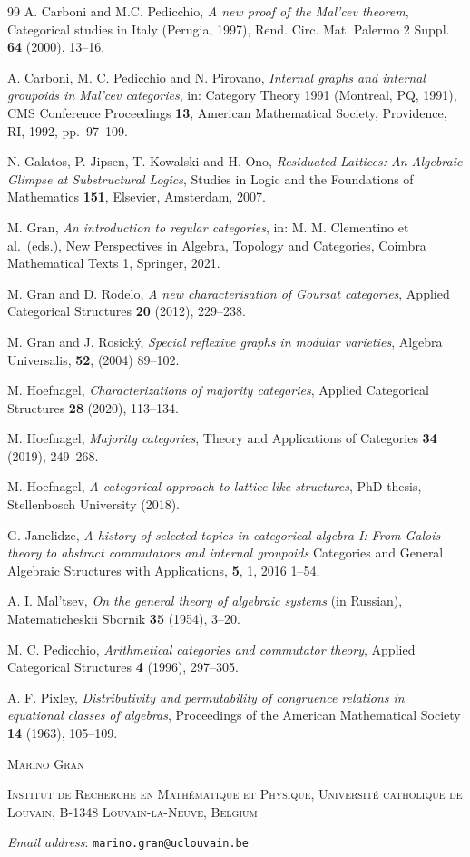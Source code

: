 \documentclass[11pt,a4paper]{article}
\theoremstyle{plain}
\theoremstyle{definition}
\theoremstyle{remark}
\theoremstyle{plain}
\newcommand{\finaladdress}[3]{%
  \bigskip\noindent
  {\scshape #1}\par
  \smallskip\noindent
  {\scshape #2}\par
  \smallskip\noindent
  {\itshape Email address}: \texttt{#3}\par}
\begin{document}
\begin{thebibliography}{99}
 A. Carboni and M.C. Pedicchio, \emph{A new proof of the Mal'cev theorem}, Categorical studies in Italy (Perugia, 1997), Rend. Circ. Mat. Palermo 2 Suppl. \textbf{64} (2000), 13--16.

 A. Carboni, M. C. Pedicchio and N. Pirovano, \emph{Internal
graphs and internal groupoids in Mal'cev categories}, in: Category Theory
1991 (Montreal, PQ, 1991), CMS Conference Proceedings \textbf{13},
American Mathematical Society, Providence, RI, 1992, pp.~97--109.

 N. Galatos, P. Jipsen, T. Kowalski and H. Ono,
\emph{Residuated Lattices: An Algebraic Glimpse at Substructural Logics},
Studies in Logic and the Foundations of Mathematics \textbf{151},
Elsevier, Amsterdam, 2007.

 M. Gran, \emph{An introduction to regular categories}, in:
M. M. Clementino et al.\ (eds.), New Perspectives in Algebra, Topology and
Categories, Coimbra Mathematical Texts 1, Springer, 2021.

 M. Gran and D. Rodelo, \emph{A new characterisation of Goursat
categories}, Applied Categorical Structures \textbf{20} (2012), 229--238.

 M. Gran and J. Rosick\'y, \emph{Special reflexive graphs in modular varieties}, Algebra Universalis, \textbf{52},  (2004) 89--102.

 M. Hoefnagel, \emph{Characterizations of majority
categories}, Applied Categorical Structures \textbf{28} (2020), 113--134.

 M. Hoefnagel, \emph{Majority categories}, Theory and
Applications of Categories \textbf{34} (2019), 249--268.

 M. Hoefnagel, \emph{A categorical approach to lattice-like structures}, PhD thesis, Stellenbosch University (2018).

G. Janelidze, 
  \emph{A history of selected topics in categorical algebra {I}:
             From {G}alois theory to abstract commutators and internal groupoids} Categories and General Algebraic Structures with Applications,
 \textbf{5},  {1},  {2016} {1--54},


 A. I. Mal'tsev, \emph{On the general theory of algebraic
systems} (in Russian), Matematicheskii Sbornik \textbf{35} (1954), 3--20.

 M. C. Pedicchio, \emph{Arithmetical categories and
commutator theory}, Applied Categorical Structures \textbf{4} (1996),
297--305.

 A. F. Pixley, \emph{Distributivity and permutability of
congruence relations in equational classes of algebras}, Proceedings of the
American Mathematical Society \textbf{14} (1963), 105--109.

\end{thebibliography}

\finaladdress{Marino Gran}%
{Institut de Recherche en Mathématique et Physique, Université catholique de Louvain, B-1348 Louvain-la-Neuve, Belgium}%
{marino.gran@uclouvain.be}
\end{document}
